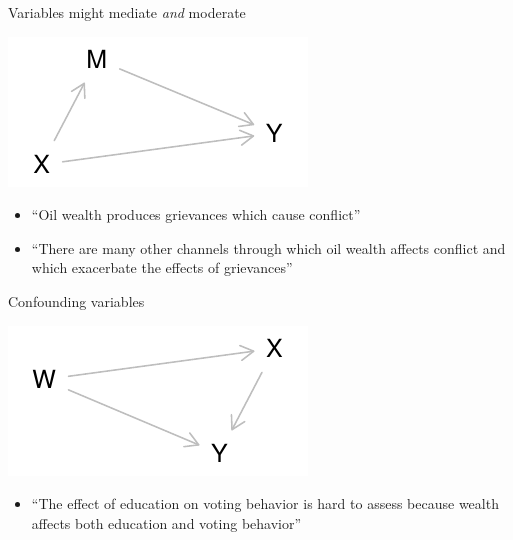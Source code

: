 \documentclass[
  11pt,
  ignorenonframetext,
]{beamer}
\providecommand{\tightlist}{%
  \setlength{\itemsep}{0pt}\setlength{\parskip}{0pt}}
\begin{document}
\begin{frame}{Variables might mediate \emph{and} moderate}
\protect\hypertarget{variables-might-mediate-and-moderate}{}
\begin{center}\includegraphics[height=0.5\textheight]{_nodes_and_claims_files/figure-beamer/unnamed-chunk-5-1} \end{center}

\begin{itemize}
\tightlist
\item
  ``Oil wealth produces grievances which cause conflict''\\
\item
  ``There are many other channels through which oil wealth affects
  conflict and which exacerbate the effects of grievances''
\end{itemize}
\end{frame}

\begin{frame}{Confounding variables}
\protect\hypertarget{confounding-variables}{}
\begin{center}\includegraphics[height=0.5\textheight]{_nodes_and_claims_files/figure-beamer/unnamed-chunk-6-1} \end{center}

\begin{itemize}
\tightlist
\item
  ``The effect of education on voting behavior is hard to assess because
  wealth affects both education and voting behavior''
\end{itemize}
\end{frame}
\end{document}
